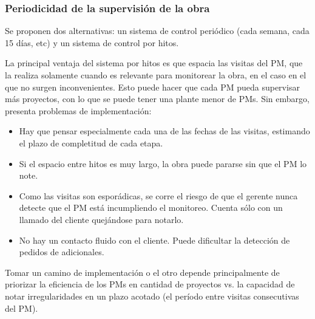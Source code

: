 \subsubsection{Periodicidad de la supervisión de la obra}
Se proponen dos alternativas: un sistema de control periódico (cada semana, cada 15 días, etc) y un sistema de control por hitos.

La principal ventaja del sistema por hitos es que espacia las visitas del PM, que la realiza solamente cuando es relevante para monitorear la obra, en el caso en el que no surgen inconvenientes. Esto puede hacer que cada PM pueda supervisar más proyectos, con lo que se puede tener una plante menor de PMs. Sin embargo, presenta problemas de implementación:
\begin{itemize}
	\item Hay que pensar especialmente cada una de las fechas de las visitas, estimando el plazo de completitud de cada etapa.
	\item Si el espacio entre hitos es muy largo, la obra puede pararse sin que el PM lo note.
	\item Como las visitas son esporádicas, se corre el riesgo de que el gerente nunca detecte que el PM está incumpliendo el monitoreo. Cuenta sólo con un llamado del cliente quejándose para notarlo.
	\item No hay un contacto fluido con el cliente. Puede dificultar la detección de pedidos de adicionales.
\end{itemize}

Tomar un camino de implementación o el otro depende principalmente de priorizar la eficiencia de los PMs en cantidad de proyectos vs. la capacidad de notar irregularidades en un plazo acotado (el período entre visitas consecutivas del PM).
